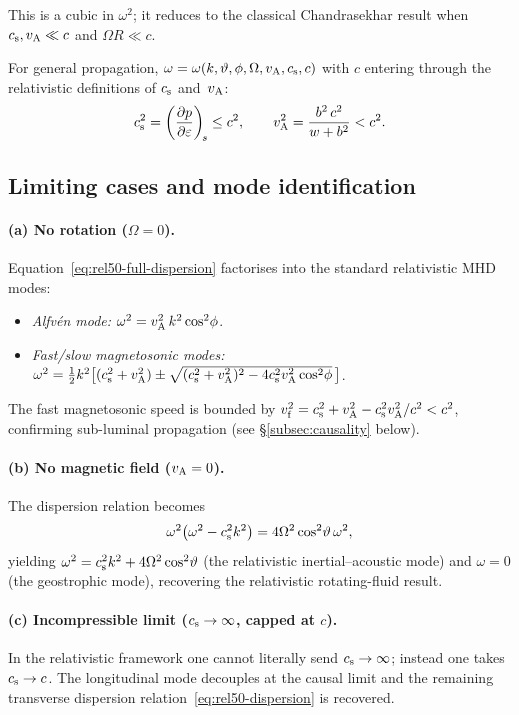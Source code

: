 This is a cubic in $\omega^{2}$; it reduces to the classical
Chandrasekhar result when $c_{\mathrm{s}},v_{\mathrm{A}}\ll c$ and $\Omega R\ll c$.

For general propagation, $\omega=\omega(k,\vartheta,\phi,\Omega,v_{\mathrm{A}},
c_{\mathrm{s}},c)$ with $c$ entering through the relativistic definitions of
$c_{\mathrm{s}}$ and~$v_{\mathrm{A}}$:
\begin{equation}
  c_{\mathrm{s}}^{2} = \left(\frac{\partial p}{\partial\varepsilon}\right)_{\!s}
  \leq c^{2},
  \qquad
  v_{\mathrm{A}}^{2} = \frac{b^{2}\,c^{2}}{w + b^{2}} < c^{2}.
  \label{eq:rel50-speeds}
\end{equation}

\subsection{Limiting cases and mode identification}

\paragraph{(a) No rotation ($\Omega=0$).}
Equation~\eqref{eq:rel50-full-dispersion} factorises into the standard
relativistic MHD modes:
\begin{itemize}
\item \emph{Alfv\'en mode:}
  $\omega^{2}=v_{\mathrm{A}}^{2}\,k^{2}\cos^{2}\!\phi$.
\item \emph{Fast/slow magnetosonic modes:}
  $\omega^{2}=\tfrac{1}{2}k^{2}
    \bigl[(c_{\mathrm{s}}^{2}+v_{\mathrm{A}}^{2})
      \pm\sqrt{(c_{\mathrm{s}}^{2}+v_{\mathrm{A}}^{2})^{2}
        -4c_{\mathrm{s}}^{2}v_{\mathrm{A}}^{2}\cos^{2}\!\phi}\,\bigr]$.
\end{itemize}
The fast magnetosonic speed is bounded by
$v_{\mathrm{f}}^{2}=c_{\mathrm{s}}^{2}+v_{\mathrm{A}}^{2}-c_{\mathrm{s}}^{2}v_{\mathrm{A}}^{2}/c^{2}<c^{2}$, confirming
sub-luminal propagation (see \S\ref{subsec:causality} below).

\paragraph{(b) No magnetic field ($v_{\mathrm{A}}=0$).}
The dispersion relation becomes
\begin{equation}
  \omega^{2}\bigl(\omega^{2}-c_{\mathrm{s}}^{2}k^{2}\bigr)
    = 4\Omega^{2}\cos^{2}\!\vartheta\,\omega^{2},
\end{equation}
yielding
$\omega^{2}=c_{\mathrm{s}}^{2}k^{2}+4\Omega^{2}\cos^{2}\!\vartheta$ (the
relativistic inertial--acoustic mode) and $\omega=0$ (the geostrophic
mode), recovering the relativistic rotating-fluid result.

\paragraph{(c) Incompressible limit ($c_{\mathrm{s}}\to\infty$, capped at $c$).}
In the relativistic framework one cannot literally send $c_{\mathrm{s}}\to\infty$;
instead one takes $c_{\mathrm{s}}\to c$.  The longitudinal mode decouples at the
causal limit and the remaining transverse dispersion
relation~\eqref{eq:rel50-dispersion} is recovered.

